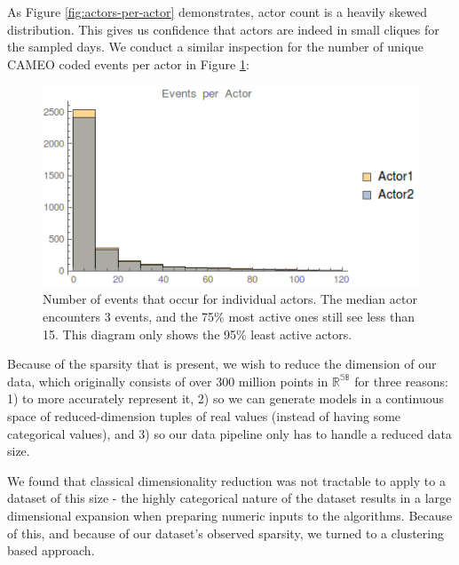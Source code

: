 As Figure \ref{fig:actors-per-actor} demonstrates, actor count is a heavily skewed distribution. This gives us confidence that actors are indeed in small cliques for the sampled days. We conduct a similar inspection for the number of unique CAMEO coded events per actor in Figure \ref{fig:events-per-actor}:

\begin{figure}[ht]
\vskip 0.2in
\begin{center}
\centerline{\includegraphics[width=\columnwidth]{images/events-per-actor}}
\caption{Number of events that occur for individual actors. The median actor encounters 3 events, and the 75\% most active ones still see less than 15. This diagram only shows the 95\% least active actors.}
\end{center}
\vskip -0.2in
\label{fig:events-per-actor}
\end{figure} 

Because of the sparsity that is present, we wish to reduce the dimension of our data, which originally consists of over 300 million points in $\mathbb{R^{58}}$ for three reasons: 1) to more accurately represent it, 2) so we can generate models in a continuous space of reduced-dimension tuples of real values (instead of having some categorical values), and 3) so our data pipeline only has to handle a reduced data size.

We found that classical dimensionality reduction was not tractable to apply to a dataset of this size - the highly categorical nature of the dataset results in a large dimensional expansion when preparing numeric inputs to the algorithms. Because of this, and because of our dataset's observed sparsity, we turned to a clustering based approach. 

